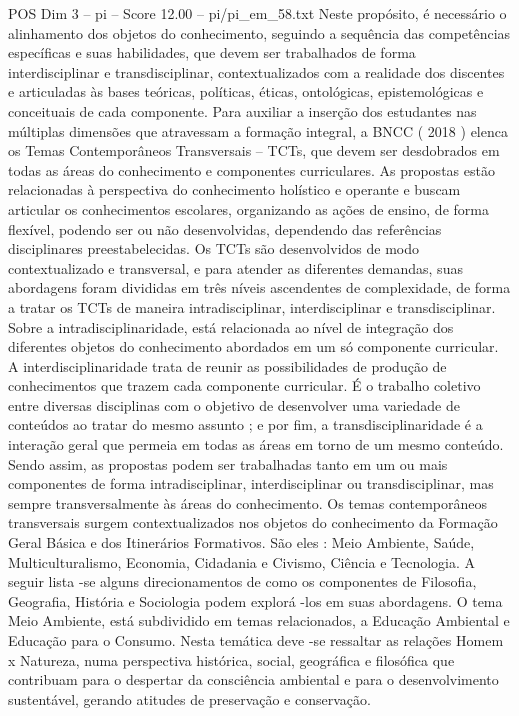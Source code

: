 \begin{textsample}{POS Dim 3 – pi – Score 12.00 – pi/pi\_em\_58.txt}
Neste propósito, é necessário o alinhamento dos objetos do conhecimento, seguindo a sequência das competências específicas e suas habilidades, que devem ser trabalhados de forma interdisciplinar e transdisciplinar, contextualizados com a realidade dos discentes e articuladas às bases teóricas, políticas, éticas, ontológicas, epistemológicas e conceituais de cada componente.
Para auxiliar a inserção dos estudantes nas múltiplas dimensões que atravessam a formação integral, a BNCC ( 2018 ) elenca os Temas Contemporâneos Transversais – TCTs, que devem ser desdobrados em todas as áreas do conhecimento e componentes curriculares.
As propostas estão relacionadas à perspectiva do conhecimento holístico e operante e buscam articular os conhecimentos escolares, organizando as ações de ensino, de forma flexível, podendo ser ou não desenvolvidas, dependendo das referências disciplinares preestabelecidas.
Os TCTs são desenvolvidos de modo contextualizado e transversal, e para atender as diferentes demandas, suas abordagens foram divididas em três níveis ascendentes de complexidade, de forma a tratar os TCTs de maneira intradisciplinar, interdisciplinar e transdisciplinar.
Sobre a intradisciplinaridade, está relacionada ao nível de integração dos diferentes objetos do conhecimento abordados em um só componente curricular.
A interdisciplinaridade trata de reunir as possibilidades de produção de conhecimentos que trazem cada componente curricular.
É o trabalho coletivo entre diversas disciplinas com o objetivo de desenvolver uma variedade de conteúdos ao tratar do mesmo assunto ; e por fim, a transdisciplinaridade é a interação geral que permeia em todas as áreas em torno de um mesmo conteúdo.
Sendo assim, as propostas podem ser trabalhadas tanto em um ou mais componentes de forma intradisciplinar, interdisciplinar ou transdisciplinar, mas sempre transversalmente às áreas do conhecimento.
Os temas contemporâneos transversais surgem contextualizados nos objetos do conhecimento da Formação Geral Básica e dos Itinerários Formativos.
São eles : Meio Ambiente, Saúde, Multiculturalismo, Economia, Cidadania e Civismo, Ciência e Tecnologia.
A seguir lista -se alguns direcionamentos de como os componentes de Filosofia, Geografia, História e Sociologia podem explorá -los em suas abordagens.
O tema Meio Ambiente, está subdividido em temas relacionados, a Educação Ambiental e Educação para o Consumo.
Nesta temática deve -se ressaltar as relações Homem x Natureza, numa perspectiva histórica, social, geográfica e filosófica que contribuam para o despertar da consciência ambiental e para o desenvolvimento sustentável, gerando atitudes de preservação e conservação.

\end{textsample}
